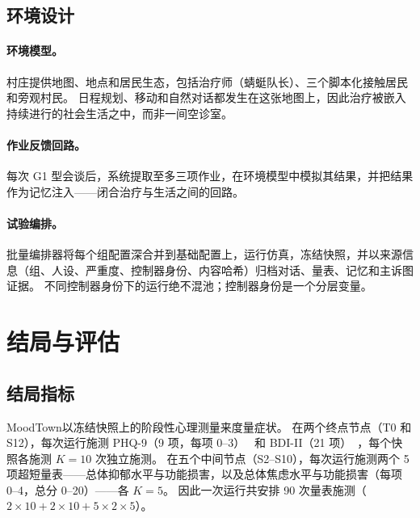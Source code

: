 \documentclass[11pt,a4paper]{article}
\newcommand{\sys}{MoodTown}
\begin{document}
\subsection{环境设计}\label{sec:environment}

\paragraph{环境模型。}
村庄提供地图、地点和居民生态，包括治疗师（蜻蜓队长）、三个脚本化接触居民和旁观村民。
日程规划、移动和自然对话都发生在这张地图上，因此治疗被嵌入持续进行的社会生活之中，而非一间空诊室。

\paragraph{作业反馈回路。}
每次 G1 型会谈后，系统提取至多三项作业，在环境模型中模拟其结果，并把结果作为记忆注入——闭合治疗与生活之间的回路。

\paragraph{试验编排。}
批量编排器将每个组配置深合并到基础配置上，运行仿真，冻结快照，并以来源信息（组、人设、严重度、控制器身份、内容哈希）归档对话、量表、记忆和主诉图证据。
不同控制器身份下的运行绝不混池；控制器身份是一个分层变量。

\section{结局与评估}\label{sec:outcome}

\subsection{结局指标}\label{sec:outcomes}

\sys 以冻结快照上的阶段性心理测量来度量症状。
在两个终点节点（T0 和 S12），每次运行施测 PHQ-9（9 项，每项 0--3）~\citep{kroenke2001} 和 BDI-II（21 项）~\citep{beck1996}，每个快照各施测 $K=10$ 次独立施测。
在五个中间节点（S2--S10），每次运行施测两个 5 项超短量表——总体抑郁水平与功能损害，以及总体焦虑水平与功能损害（每项 0--4，总分 0--20）——各 $K=5$。
因此一次运行共安排 90 次量表施测（$2 \times 10 + 2 \times 10 + 5 \times 2 \times 5$）。
\end{document}
